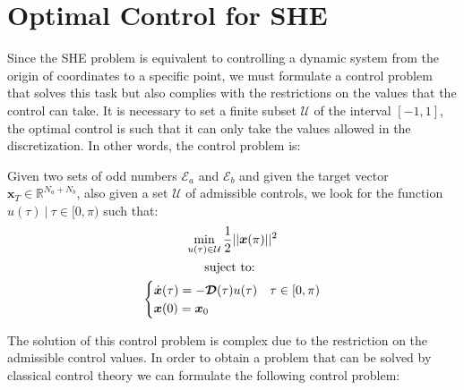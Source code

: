 
\section{Optimal Control for SHE}

Since the SHE problem is equivalent to controlling a dynamic system from the origin of coordinates to a specific point, we must formulate a control problem that solves this task but also complies with the restrictions on the values that the control can take. It is necessary to set a finite subset $ \mathcal {U} $ of the interval $ [- 1,1] $, the optimal control is such that it can only take the values allowed in the discretization. In other words, the control problem is:
\begin{problem}\label{OCP1}
    Given two sets of odd numbers $ \mathcal {E} _a $ and $ \mathcal {E} _b $ and given the target vector $ \bm {x} _T \in \mathbb {R} ^ {N_a + N_b} $, also given a set $ \mathcal {U} $ of admissible controls, we look for the function $ u (\tau) \ | \ \tau \in [0, \pi) $ such that:
    \begin{gather}
        \min_{u(\tau) \in \mathcal{U}}         
         \frac{1}{2}|| \bm{x}(\pi)  ||^2   \\
        \notag \text{suject to: } \\
        \begin{cases}
            \dot{\bm{x}}(\tau) = -\bm{\mathcal{D}}(\tau) u(\tau)  & \tau \in [0,\pi)\\
            \bm{x}(0) = \bm{x}_0
        \end{cases}
    \end{gather}
\end{problem}
%
The solution of this control problem is complex due to the restriction on the admissible control values.
%
In order to obtain a problem that can be solved by classical control theory we can formulate the following control problem:

